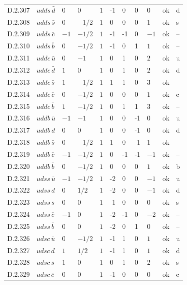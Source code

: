 {\begin{longtable}{@{}llllllllll>{\raggedright\arraybackslash}p{2.0cm}@{}}
D.2.307 & $udds\,\bar{d}$ & $0$ & $0$ & $1$ & -1 & 0 & 0 & $0$ & ok & d \\
D.2.308 & $udds\,\bar{s}$ & $0$ & $-1/2$ & $1$ & 0 & 0 & 0 & $1$ & ok & s \\
D.2.309 & $udds\,\bar{c}$ & $-1$ & $-1/2$ & $1$ & -1 & -1 & 0 & $-1$ & ok & -- \\
D.2.310 & $udds\,\bar{b}$ & $0$ & $-1/2$ & $1$ & -1 & 0 & 1 & $1$ & ok & -- \\
D.2.311 & $uddc\,\bar{u}$ & $0$ & $-1$ & $1$ & 0 & 1 & 0 & $2$ & ok & u \\
D.2.312 & $uddc\,\bar{d}$ & $1$ & $0$ & $1$ & 0 & 1 & 0 & $2$ & ok & d \\
D.2.313 & $uddc\,\bar{s}$ & $1$ & $-1/2$ & $1$ & 1 & 1 & 0 & $3$ & ok & -- \\
D.2.314 & $uddc\,\bar{c}$ & $0$ & $-1/2$ & $1$ & 0 & 0 & 0 & $1$ & ok & c \\
D.2.315 & $uddc\,\bar{b}$ & $1$ & $-1/2$ & $1$ & 0 & 1 & 1 & $3$ & ok & -- \\
D.2.316 & $uddb\,\bar{u}$ & $-1$ & $-1$ & $1$ & 0 & 0 & -1 & $0$ & ok & u \\
D.2.317 & $uddb\,\bar{d}$ & $0$ & $0$ & $1$ & 0 & 0 & -1 & $0$ & ok & d \\
D.2.318 & $uddb\,\bar{s}$ & $0$ & $-1/2$ & $1$ & 1 & 0 & -1 & $1$ & ok & -- \\
D.2.319 & $uddb\,\bar{c}$ & $-1$ & $-1/2$ & $1$ & 0 & -1 & -1 & $-1$ & ok & -- \\
D.2.320 & $uddb\,\bar{b}$ & $0$ & $-1/2$ & $1$ & 0 & 0 & 0 & $1$ & ok & b \\
D.2.321 & $udss\,\bar{u}$ & $-1$ & $-1/2$ & $1$ & -2 & 0 & 0 & $-1$ & ok & u \\
D.2.322 & $udss\,\bar{d}$ & $0$ & $1/2$ & $1$ & -2 & 0 & 0 & $-1$ & ok & d \\
D.2.323 & $udss\,\bar{s}$ & $0$ & $0$ & $1$ & -1 & 0 & 0 & $0$ & ok & s \\
D.2.324 & $udss\,\bar{c}$ & $-1$ & $0$ & $1$ & -2 & -1 & 0 & $-2$ & ok & -- \\
D.2.325 & $udss\,\bar{b}$ & $0$ & $0$ & $1$ & -2 & 0 & 1 & $0$ & ok & -- \\
D.2.326 & $udsc\,\bar{u}$ & $0$ & $-1/2$ & $1$ & -1 & 1 & 0 & $1$ & ok & u \\
D.2.327 & $udsc\,\bar{d}$ & $1$ & $1/2$ & $1$ & -1 & 1 & 0 & $1$ & ok & d \\
D.2.328 & $udsc\,\bar{s}$ & $1$ & $0$ & $1$ & 0 & 1 & 0 & $2$ & ok & s \\
D.2.329 & $udsc\,\bar{c}$ & $0$ & $0$ & $1$ & -1 & 0 & 0 & $0$ & ok & c \\

\end{longtable}}
